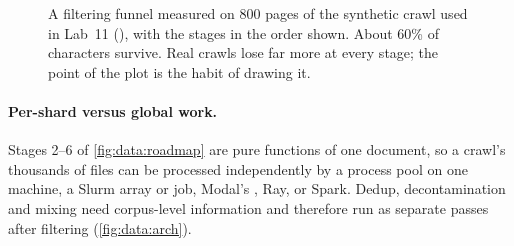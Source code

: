 \begin{figure}[t]
\centering
{}
\caption{A filtering funnel measured on 800 pages of the synthetic crawl used in Lab~11
(), with the stages in the order shown. About 60\% of characters
survive. Real crawls lose far more at every stage; the point of the plot is the habit of drawing it.}
\label{fig:data:funnel}
\end{figure}

\paragraph{Per-shard versus global work.} Stages 2--6 of \cref{fig:data:roadmap} are pure
functions of one document, so a crawl's thousands of files can be processed independently by a
process pool on one machine, a Slurm array or  job, Modal's , Ray, or Spark.
Dedup, decontamination and mixing need corpus-level information and therefore run as separate
passes after filtering (\cref{fig:data:arch}).

